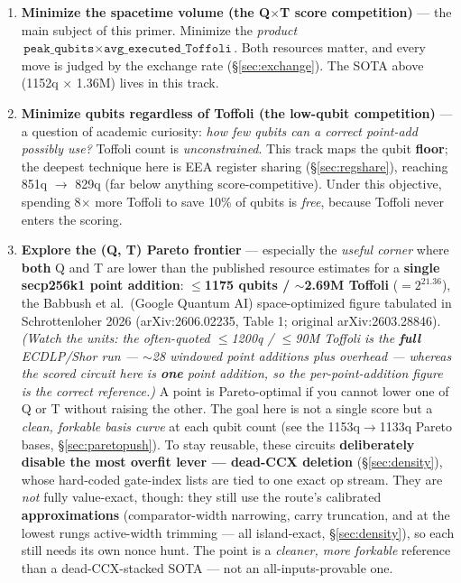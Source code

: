 \documentclass[11pt,a4paper]{article}
\begin{document}
\begin{enumerate}
  \item \textbf{Minimize the spacetime volume (the Q$\times$T score competition)} --- the main
    subject of this primer. Minimize the \emph{product}
    $\texttt{peak\_qubits} \times \texttt{avg\_executed\_Toffoli}$. Both resources matter, and every
    move is judged by the exchange rate (\S\ref{sec:exchange}). The SOTA above (1152q $\times$ 1.36M)
    lives in this track.
  \item \textbf{Minimize qubits regardless of Toffoli (the low-qubit competition)} --- a question of
    academic curiosity: \emph{how few qubits can a correct point-add possibly use?} Toffoli count is
    \emph{unconstrained}. This track maps the qubit \textbf{floor}; the deepest technique here is EEA
    register sharing (\S\ref{sec:regshare}), reaching 851q $\to$ 829q (far below anything
    score-competitive). Under this objective, spending 8$\times$ more Toffoli to save 10\% of qubits
    is \emph{free}, because Toffoli never enters the scoring.
  \item \textbf{Explore the (Q, T) Pareto frontier} --- especially the \emph{useful corner} where
    \textbf{both} Q and T are lower than the published resource estimates for a \textbf{single
    secp256k1 point addition}: \textbf{$\leq$1175 qubits / $\sim$2.69M Toffoli} ($= 2^{21.36}$), the
    Babbush et al.\ (Google Quantum AI) space-optimized figure tabulated in Schrottenloher 2026
    (arXiv:2606.02235, Table 1; original arXiv:2603.28846). \emph{(Watch the units: the often-quoted
    $\leq$1200q / $\leq$90M Toffoli is the \textbf{full} ECDLP/Shor run --- $\sim$28 windowed point
    additions plus overhead --- whereas the scored circuit here is \textbf{one} point addition, so
    the per-point-addition figure is the correct reference.)} A point is Pareto-optimal if you cannot
    lower one of Q or T without raising the other. The goal here is not a single score but a
    \emph{clean, forkable basis curve} at each qubit count (see the 1153q$\to$1133q Pareto bases,
    \S\ref{sec:paretopush}). To stay reusable, these circuits \textbf{deliberately disable the most
    overfit lever --- dead-CCX deletion} (\S\ref{sec:density}), whose hard-coded gate-index lists are
    tied to one exact op stream. They are \emph{not} fully value-exact, though: they still use the
    route's calibrated \textbf{approximations} (comparator-width narrowing, carry truncation, and at
    the lowest rungs active-width trimming --- all island-exact, \S\ref{sec:density}), so each still
    needs its own nonce hunt. The point is a \emph{cleaner, more forkable} reference than a
    dead-CCX-stacked SOTA --- not an all-inputs-provable one.
\end{enumerate}
\end{document}
